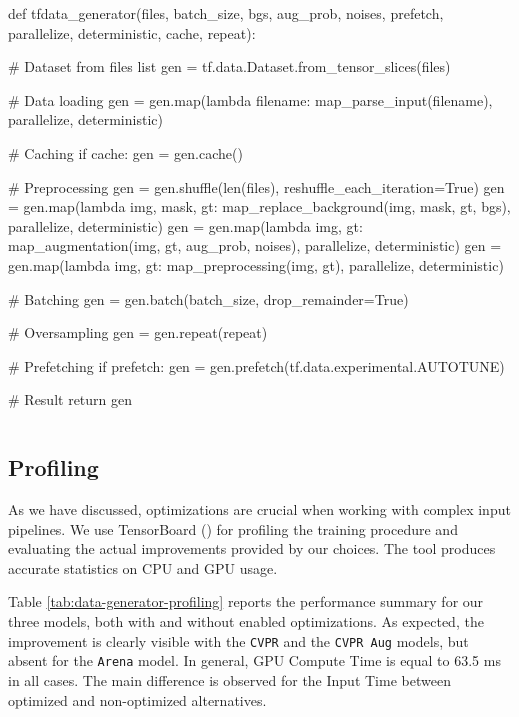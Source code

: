 \vspace{0.2cm}
\begin{python}
def tfdata_generator(files, batch_size, 
                     bgs, aug_prob, noises,
                     prefetch, parallelize, deterministic,
                     cache, repeat):

    # Dataset from files list
    gen = tf.data.Dataset.from_tensor_slices(files)
    
    # Data loading
    gen = gen.map(lambda filename: 
                    map_parse_input(filename),
                    parallelize, deterministic)

    # Caching
    if cache:
        gen = gen.cache()
    
    # Preprocessing
    gen = gen.shuffle(len(files), reshuffle_each_iteration=True)
    gen = gen.map(lambda img, mask, gt: 
                    map_replace_background(img, mask, gt, bgs),
                    parallelize, deterministic)
    gen = gen.map(lambda img, gt: 
                    map_augmentation(img, gt, aug_prob, noises), 
                    parallelize, deterministic)
    gen = gen.map(lambda img, gt: 
                    map_preprocessing(img, gt), 
                    parallelize, deterministic)

    # Batching
    gen = gen.batch(batch_size, drop_remainder=True)
    
    # Oversampling
    gen = gen.repeat(repeat)

    # Prefetching
    if prefetch:
        gen = gen.prefetch(tf.data.experimental.AUTOTUNE)

    # Result
    return gen
\end{python}
\vspace{-0.5cm}
\begin{lstlisting}[frame=none,caption={Chosen \texttt{tf.data} input pipeline}, 
label=lst:tfdata_generator]
\end{lstlisting}


\subsection{Profiling}

As we have discussed, optimizations are crucial when working with complex input pipelines. We use TensorBoard (\cite{tensorboard}) for profiling the training procedure and evaluating the actual improvements provided by our choices. The tool produces accurate statistics on CPU and GPU usage.

Table \ref{tab:data-generator-profiling} reports the performance summary for our three models, both with and without enabled optimizations. As expected, the improvement is clearly visible with the \texttt{CVPR} and the \texttt{CVPR Aug} models, but absent for the \texttt{Arena} model. In general, GPU Compute Time is equal to 63.5 ms in all cases. The main difference is observed for the Input Time between optimized and non-optimized alternatives.

